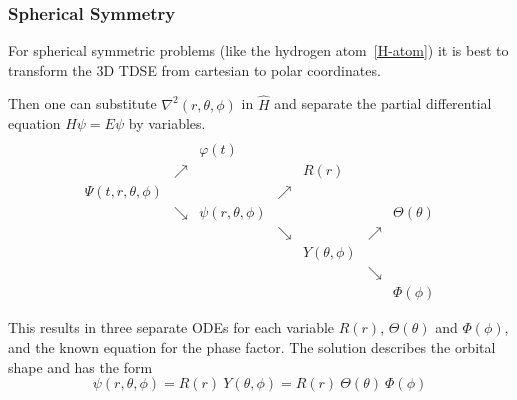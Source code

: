 \subsubsection{Spherical Symmetry}\label{3dSE_spherical_symmetry}
For spherical symmetric problems (like the hydrogen atom~\ref{H-atom}) it is best to transform the 3D TDSE from cartesian to polar coordinates.

\newpar{}

Then one can substitute $\nabla^2(r, \theta, \phi)$ in $\widehat{H}$ and separate the partial differential equation $\widehat{H}\psi = E\psi$ by variables.
\renewcommand{\arraystretch}{0.7}
\setlength{\oldtabcolsep}{\tabcolsep}\setlength\tabcolsep{0pt}
\begin{equation*}
    \begin{matrix}
                                 &          &                     &          &                 &          &                \\
                                 &          & \varphi(t)          &          &                 &          &                \\
                                 & \nearrow &                     &          & R(r)            &          &                \\
        \Psi(t, r, \theta, \phi) &          &                     & \nearrow &                 &          &                \\
                                 & \searrow & \psi(r,\theta,\phi) &          &                 &          & \Theta(\theta) \\
                                 &          &                     & \searrow &                 & \nearrow &                \\
                                 &          &                     &          & Y(\theta, \phi) &          &                \\
                                 &          &                     &          &                 & \searrow &                \\
                                 &          &                     &          &                 &          & \Phi(\phi)
    \end{matrix}
\end{equation*}
\renewcommand{\arraystretch}{1}
\setlength\tabcolsep{\oldtabcolsep}

This results in three separate ODEs for each variable $R(r)$, $\Theta(\theta)$ and $\Phi(\phi)$, and the known equation for the phase factor. The solution describes the orbital shape and has the form
\begin{equation*}
    \psi(r,\theta,\phi) = R(r)\:Y(\theta, \phi) = R(r)\:\Theta(\theta)\:\Phi(\phi)
\end{equation*}

